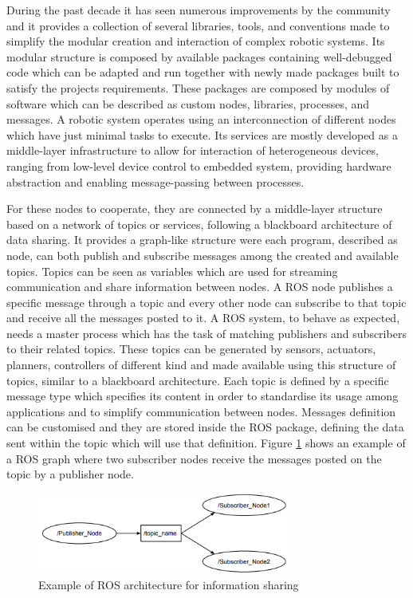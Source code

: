 During the past decade it has seen numerous improvements by the community and it provides a collection of several libraries, tools, and conventions made to simplify the modular creation and interaction of complex robotic systems.
Its modular structure is composed by available packages containing well-debugged code which can be adapted and run together with newly made packages built to satisfy the projects requirements.
These packages are composed by modules of software which can be described as custom nodes, libraries, processes, and messages.
A robotic system operates using an interconnection of different nodes which have just minimal tasks to execute.
Its services are mostly developed as a middle-layer infrastructure to allow for interaction of heterogeneous devices, ranging from low-level device control to embedded system, providing hardware abstraction and enabling message-passing between processes.

For these nodes to cooperate, they are connected by a middle-layer structure based on a network of topics or services, following a blackboard architecture of data sharing.
It provides a graph-like structure were each program, described as node, can both publish and subscribe messages among the created and available topics.
Topics can be seen as variables which are used for streaming communication and share information between nodes. 
A \Gls{ROS} node publishes a specific message through a topic and every other node can subscribe to that topic and receive all the messages posted to it.
A \Gls{ROS} system, to behave as expected, needs a master process which has the task of matching publishers and subscribers to their related topics.
These topics can be generated by sensors, actuators, planners, controllers of different kind and made available using this structure of topics, similar to a blackboard architecture.
Each topic is defined by a specific message type which specifies its content in order to standardise its usage among applications and to simplify communication between nodes. 
Messages definition can be customised and they are stored inside the \Gls{ROS} package, defining the data sent within the topic which will use that definition.
Figure \ref{fig:ros-topic} shows an example of a \Gls{ROS} graph where two subscriber nodes receive the messages posted on the topic by a publisher node.
    
\begin{figure}[!ht]
  \begin{center}
    \includegraphics[width=0.75\textwidth]{Images/2-Background/ROSTopic-2021-04-22 10-51-37.png}
  \end{center}
  \caption{Example of \Gls{ROS} architecture for information sharing\cite{palsson_investigating_2017}}
  \label{fig:ros-topic}
\end{figure}

